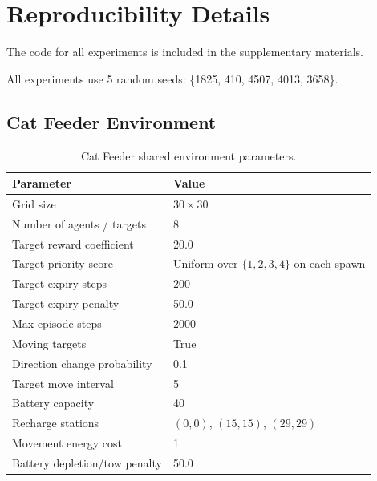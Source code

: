 \section{Reproducibility Details}

The code for all experiments is included in the supplementary materials.

All experiments use 5 random seeds: \{1825, 410, 4507, 4013, 3658\}.

\subsection{Cat Feeder Environment}

\begin{table}[h]
\centering
\begin{tabular}{ll}
\toprule
Parameter & Value \\
\midrule
Grid size & $30 \times 30$ \\
Number of agents / targets & 8 \\
Target reward coefficient & 20.0 \\
Target priority score & Uniform over $\{1,2,3,4\}$ on each spawn \\
Target expiry steps & 200 \\
Target expiry penalty & 50.0 \\
Max episode steps & 2000 \\
Moving targets & True \\
Direction change probability & 0.1 \\
Target move interval & 5 \\
Battery capacity & 40 \\
Recharge stations & $(0,0)$, $(15,15)$, $(29,29)$ \\
Movement energy cost & 1 \\
Battery depletion/tow penalty & 50.0 \\
\bottomrule
\end{tabular}
\caption{Cat Feeder shared environment parameters.}
\end{table}


